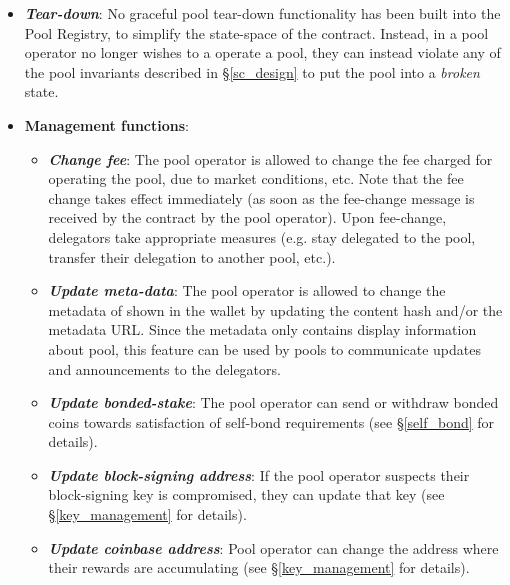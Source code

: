 \begin{itemize}
    \item \textbf{\textit{Tear-down}}: No graceful pool tear-down functionality has been built into the Pool Registry, to simplify the state-space of the contract. Instead, in a pool operator no longer wishes to a operate a pool, they can instead violate any of the pool invariants described in \S\ref{sc_design} to put the pool into a \textit{broken} state. 
    
    \item \textbf{Management functions}:
    \begin{itemize}
        \item \textbf{\textit{Change fee}}: The pool operator is allowed to change the fee charged for operating the pool, due to market conditions, etc. Note that the fee change takes effect immediately (as soon as the fee-change message is received by the contract by the pool operator). Upon fee-change, delegators take appropriate measures (e.g. stay delegated to the pool, transfer their delegation to another pool, etc.).
        \item \textbf{\textit{Update meta-data}}: The pool operator is allowed to change the metadata of shown in the wallet by updating the content hash and/or the metadata URL. Since the metadata only contains display information about pool, this feature can be used by pools to communicate updates and announcements to the delegators. 
        \item \textbf{\textit{Update bonded-stake}}: The pool operator can send or withdraw bonded coins towards satisfaction of self-bond requirements (see \S\ref{self_bond} for details). 
        \item \textbf{\textit{Update block-signing address}}: If the pool operator suspects their block-signing key is compromised, they can update that  key (see \S\ref{key_management} for details). 
        \item \textbf{\textit{Update coinbase address}}: Pool operator can change the address where their rewards are accumulating (see \S\ref{key_management} for details). 
    \end{itemize}
\end{itemize}

